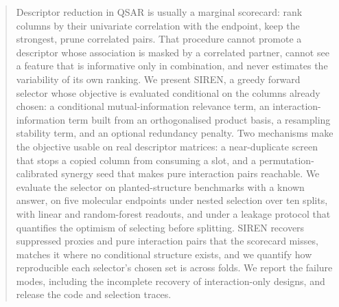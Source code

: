\begin{abstract}
Descriptor reduction in QSAR is usually a marginal scorecard: rank columns by
their univariate correlation with the endpoint, keep the strongest, prune
correlated pairs. That procedure cannot promote a descriptor whose association
is masked by a correlated partner, cannot see a feature that is informative only
in combination, and never estimates the variability of its own ranking. We
present SIREN, a greedy forward selector whose objective is evaluated
conditional on the columns already chosen: a conditional
mutual-information relevance term, an interaction-information term built from an
orthogonalised product basis, a resampling stability term, and an optional
redundancy penalty. Two mechanisms make the objective usable on real descriptor
matrices: a near-duplicate screen that stops a copied column from consuming a
slot, and a permutation-calibrated synergy seed that makes pure interaction pairs
reachable. We evaluate the selector on planted-structure benchmarks with a known
answer, on five molecular endpoints under nested selection over ten splits, with
linear and random-forest readouts, and under a leakage protocol that quantifies
the optimism of selecting before splitting. SIREN recovers suppressed proxies
and pure interaction pairs that the scorecard misses, matches it where no
conditional structure exists, and we quantify how reproducible each selector's
chosen set is across folds. We report the failure modes, including the
incomplete recovery of interaction-only designs, and release the code and
selection traces.
\end{abstract}
